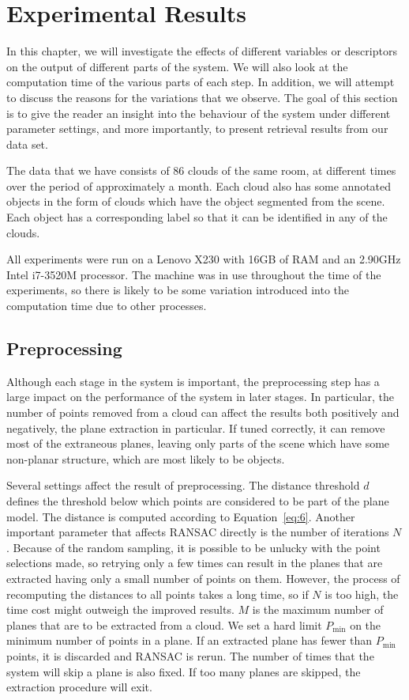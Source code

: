 \documentclass[11pt,a4paper]{kth-mag}
\begin{document}
\chapter{Experimental Results}
\label{chap:exp}
In this chapter, we will investigate the effects of different variables or
descriptors on the output of different parts of the system. We will also look at
the computation time of the various parts of each step. In addition, we will
attempt to discuss the reasons for the variations that we observe. The goal of
this section is to give the reader an insight into the behaviour of the system
under different parameter settings, and more importantly, to present retrieval
results from our data set.

The data that we have consists of 86 clouds of the same room, at different times
over the period of approximately a month. Each cloud also has some annotated
objects in the form of clouds which have the object segmented from the scene.
Each object has a corresponding label so that it can be identified in any of the
clouds.

All experiments were run on a Lenovo X230 with 16GB of RAM and an 2.90GHz Intel
i7-3520M processor. The machine was in use throughout the time of the
experiments, so there is likely to be some variation introduced into the
computation time due to other processes.

\section{Preprocessing}
Although each stage in the system is important, the preprocessing step has a
large impact on the performance of the system in later stages. In particular,
the number of points removed from a cloud can affect the results both positively
and negatively, the plane extraction in particular. If tuned correctly, it can
remove most of the extraneous planes, leaving only parts of the scene which have
some non-planar structure, which are most likely to be objects. 

Several settings affect the result of preprocessing. The distance threshold $d$
defines the threshold below which points are considered to be part of the plane
model. The distance is computed according to Equation~\eqref{eq:6}. Another
important parameter that affects RANSAC directly is the number of iterations
$N$. Because of the random sampling, it is possible to be unlucky with the point
selections made, so retrying only a few times can result in the planes that are
extracted having only a small number of points on them. However, the process of
recomputing the distances to all points takes a long time, so if $N$ is too
high, the time cost might outweigh the improved results. $M$ is the maximum
number of planes that are to be extracted from a cloud. We set a hard limit
$P_{\min}$ on the minimum number of points in a plane. If an extracted plane has
fewer than $P_{\min}$ points, it is discarded and RANSAC is rerun. The number of
times that the system will skip a plane is also fixed. If too many planes are
skipped, the extraction procedure will exit.
\end{document}
